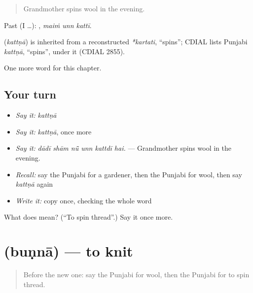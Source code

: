 \begin{quote}
Grandmother spins wool in the evening.
\end{quote}

Past (I …):   , \emph{maiṁ unn kattī}.

\begin{cousinweb}
\textbf{} (\emph{kattṇā}) is inherited from a reconstructed \emph{*kartati}, \textquotedblleft{}spins\textquotedblright{}; CDIAL lists Punjabi \emph{kattṇā}, \textquotedblleft{}spins\textquotedblright{}, under it (CDIAL 2855).
\end{cousinweb}

\begin{grammarlens}[title={What you've built}]
One more word for this chapter.
\end{grammarlens}

\subsection*{Your turn}
\begin{itemize}
\raggedright
  \item \emph{Say it:} \emph{kattṇā}
  \item \emph{Say it:} \emph{kattṇā}, once more
  \item \emph{Say it:} \emph{dādī shām nū̃ unn kattdī hai.} — Grandmother spins wool in the evening.
  \item \emph{Recall:} say the Punjabi for a gardener, then the Punjabi for wool, then say \emph{kattṇā} again
  \item \emph{Write it:} copy \textbf{} once, checking the whole word
\end{itemize}

\begin{tcolorbox}[breakable,colback=teal!4,colframe=teal!35!black,title={Before you move on}]
What does  mean? (\textquotedblleft{}To spin thread\textquotedblright{}.) Say it once more.
\end{tcolorbox}
\section[\texorpdfstring{\pa{ਬੁਣਨਾ} (buṇnā)}{ਬੁਣਨਾ (buṇnā)}]{ (buṇnā) — to knit}

\label{lesson:PA-C334-bunna}



\begin{quote}
Before the new one: say the Punjabi for wool, then the Punjabi for to spin thread.
\end{quote}

